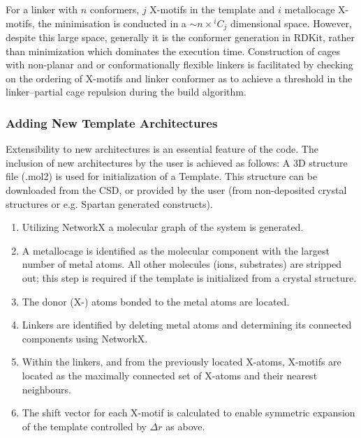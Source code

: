 \documentclass[../../main.tex]{subfiles}
\begin{document}
For a linker with $n$ conformers, $j$ X-motifs in the template and $i$ metallocage X-motifs, the minimisation is conducted in a $\sim n \times {}^iC_j$ dimensional space. However, despite this large space, generally it is the conformer generation in RDKit, rather than minimization which dominates the execution time. Construction of cages with non-planar and or conformationally flexible linkers is facilitated by checking on the ordering of X-motifs and linker conformer as to achieve a threshold in the linker–partial cage repulsion during the build algorithm.


\subsubsection{Adding New Template Architectures} 
\label{section::cg_2_2_2}

Extensibility to new architectures is an essential feature of the code. The inclusion of new architectures by the user is achieved as follows: A 3D structure file (.mol2) is used for initialization of a Template. This structure can be downloaded from the CSD, or provided by the user (from non-deposited crystal structures or e.g. Spartan\cite{Young2001} generated constructs). 

\begin{enumerate}[label=\Roman*.$\quad$]
	\item Utilizing NetworkX a molecular graph of the system is generated. 
	
	\item A metallocage is identified as the molecular component with the largest number of metal atoms. All other molecules (ions, substrates) are stripped out; this step is required if the template is initialized from a crystal structure. 
	
	\item The donor (X-) atoms bonded to the metal atoms are located. 
	
	\item Linkers are identified by deleting metal atoms and determining its connected components using NetworkX.
	
	\item Within the linkers, and from the previously located X-atoms, X-motifs are located as the maximally connected set of X-atoms and their nearest neighbours.
	
	\item The shift vector for each X-motif is calculated to enable symmetric expansion of the template controlled by $\Delta r$ as above. 
\end{enumerate}
\end{document}

